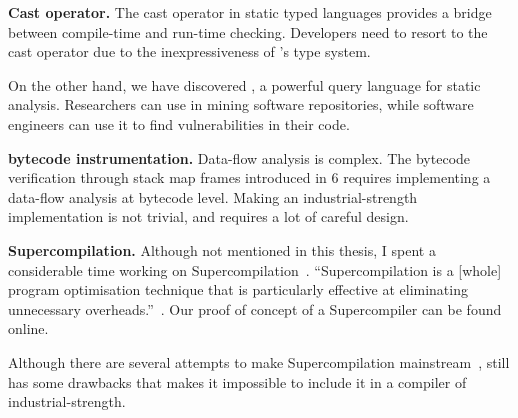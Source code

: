 \textbf{Cast operator.}
The cast operator in static typed languages provides a bridge between compile-time and run-time checking.
Developers need to resort to the cast operator due to the inexpressiveness of \java{}'s type system. 

On the other hand, we have discovered \ql{},
a powerful query language for static analysis.
Researchers can use \ql{} in mining software repositories,
while software engineers can use it to find vulnerabilities in their code.

\textbf{\java{} bytecode instrumentation.}
Data-flow analysis is complex.
The bytecode verification through stack map frames introduced in \java{} 6 requires implementing a data-flow analysis at bytecode level.
Making an industrial-strength implementation is not trivial,
and requires a lot of careful design.

\textbf{Supercompilation.}
Although not mentioned in this thesis,
I spent a considerable time working on Supercompilation~\citep{turchinConceptSupercompiler1986}.
``Supercompilation is a [whole] program optimisation technique that is particularly effective at eliminating unnecessary overheads.''~\citep{mitchellRethinkingSupercompilation2010}.
Our proof of concept of a \haskell{} Supercompiler can be found online.%

Although there are several attempts to make Supercompilation mainstream~\citep{mitchellSupercompilerCoreHaskell2007,bolingbrokeSupercompilationEvaluation2010},
still has some drawbacks that makes it impossible to include it in a compiler of industrial-strength.
